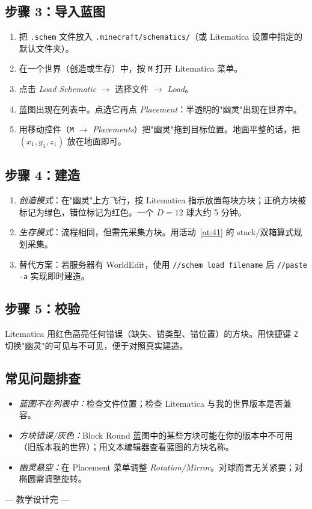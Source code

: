 \documentclass[12pt,a4paper]{scrartcl}
\newcommand{\cmd}[1]{\textcolor{earth}{\texttt{\small #1}}}
\begin{document}
\subsection{步骤 3：导入蓝图}
\begin{enumerate}[leftmargin=1.5em,itemsep=0.15em,topsep=0.3em]
  \item 把 \texttt{.schem} 文件放入 \texttt{.minecraft/schematics/}（或 Litematica 设置中指定的默认文件夹）。
  \item 在一个世界（创造或生存）中，按 \texttt{M} 打开 Litematica 菜单。
  \item 点击 \emph{Load Schematic} $\to$ 选择文件 $\to$ \emph{Load}。
  \item 蓝图出现在列表中。点选它再点 \emph{Placement}：半透明的"幽灵"出现在世界中。
  \item 用移动控件（\texttt{M} $\to$ \emph{Placements}）把"幽灵"拖到目标位置。地面平整的话，把 $(x_1, y_1, z_1)$ 放在地面即可。
\end{enumerate}

\subsection{步骤 4：建造}
\begin{enumerate}[leftmargin=1.5em,itemsep=0.15em,topsep=0.3em]
  \item \emph{创造模式}：在"幽灵"上方飞行，按 Litematica 指示放置每块方块；正确方块被标记为绿色，错位标记为红色。一个 $D = 12$ 球大约 5 分钟。
  \item \emph{生存模式}：流程相同，但需先采集方块。用活动~\ref{at:41} 的 stack/双箱算式规划采集。
  \item 替代方案：若服务器有 WorldEdit，使用 \cmd{//schem load filename} 后 \cmd{//paste -a} 实现即时建造。
\end{enumerate}

\subsection{步骤 5：校验}
Litematica 用红色高亮任何错误（缺失、错类型、错位置）的方块。用快捷键 \texttt{Z} 切换"幽灵"的可见与不可见，便于对照真实建造。

\subsection{常见问题排查}
\begin{itemize}[leftmargin=1.3em,itemsep=0.15em,topsep=0.3em,nosep]
  \item \emph{蓝图不在列表中：}检查文件位置；检查 Litematica 与我的世界版本是否兼容。
  \item \emph{方块错误/灰色：}Block Round 蓝图中的某些方块可能在你的版本中不可用（旧版本我的世界）；用文本编辑器查看蓝图的方块名称。
  \item \emph{幽灵悬空：}在 Placement 菜单调整 \emph{Rotation/Mirror}。对球而言无关紧要；对椭圆需调整旋转。
\end{itemize}

\vspace{2em}
\begin{center}
\color{muted}\small\sffamily
--- 教学设计完 ---
\end{center}
\end{document}
